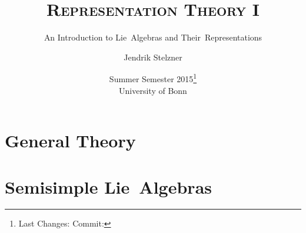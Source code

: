 \documentclass[a4paper, 10pt, oneside, openany, headings=standardclasses, bibliography=totocnumbered, index=totoc]{scrbook}
\title{\textsc{Representation Theory I}}
\subtitle{An Introduction to Lie~Algebras and Their~Representations}
\date{
  Summer Semester 2015\footnote{
    Last Changes: \texttt{\gitAuthorIsoDate}
    \hfill
    Commit: \texttt{\gitAbbrevHash}
  }
  \\
  University of Bonn
}
\author{Jendrik Stelzner}
\begin{document}
\frontmatter
\maketitle

\tableofcontents

\mainmatter
\part{General Theory}



\part{Semisimple Lie~Algebras}



\appendix %
% 

\backmatter
\printnoidxglossary[type=symbols]
\printindex
\ihead{}
\ohead{}
\printbibliography
\end{document}
